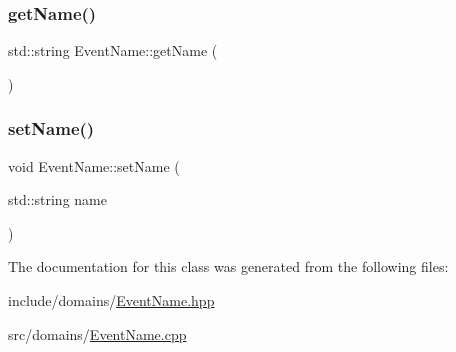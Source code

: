 \subsubsection{\texorpdfstring{getName()}{getName()}}
{\footnotesize\ttfamily std\+::string Event\+Name\+::get\+Name (\begin{DoxyParamCaption}{ }\end{DoxyParamCaption})}

\mbox{\label{class_event_name_a56c6c083913f99731f27a2becfd43672}} 
\subsubsection{\texorpdfstring{setName()}{setName()}}
{\footnotesize\ttfamily void Event\+Name\+::set\+Name (\begin{DoxyParamCaption}\item[{std\+::string}]{name }\end{DoxyParamCaption})}



The documentation for this class was generated from the following files\+:\begin{DoxyCompactItemize}
\item 
include/domains/\mbox{\hyperlink{_event_name_8hpp}{Event\+Name.\+hpp}}\item 
src/domains/\mbox{\hyperlink{_event_name_8cpp}{Event\+Name.\+cpp}}\end{DoxyCompactItemize}
